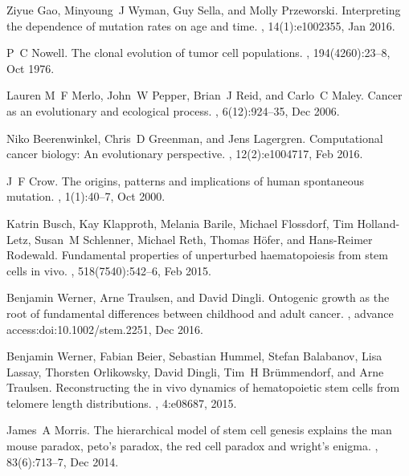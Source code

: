 \documentclass[aps,singlecolumn]{revtex4-1}
\begin{document}
%


%
\begin{thebibliography}{10}

Ziyue Gao, Minyoung~J Wyman, Guy Sella, and Molly Przeworski.
\newblock Interpreting the dependence of mutation rates on age and time.
, 14(1):e1002355, Jan 2016.

P~C Nowell.
\newblock The clonal evolution of tumor cell populations.
, 194(4260):23--8, Oct 1976.

Lauren M~F Merlo, John~W Pepper, Brian~J Reid, and Carlo~C Maley.
\newblock Cancer as an evolutionary and ecological process.
, 6(12):924--35, Dec 2006.

Niko Beerenwinkel, Chris~D Greenman, and Jens Lagergren.
\newblock Computational cancer biology: An evolutionary perspective.
, 12(2):e1004717, Feb 2016.

J~F Crow.
\newblock The origins, patterns and implications of human spontaneous mutation.
, 1(1):40--7, Oct 2000.

Katrin Busch, Kay Klapproth, Melania Barile, Michael Flossdorf, Tim
  Holland-Letz, Susan~M Schlenner, Michael Reth, Thomas H{\"o}fer, and
  Hans-Reimer Rodewald.
\newblock Fundamental properties of unperturbed haematopoiesis from stem cells
  in vivo.
, 518(7540):542--6, Feb 2015.

Benjamin Werner, Arne Traulsen, and David Dingli.
\newblock Ontogenic growth as the root of fundamental differences between
  childhood and adult cancer.
, advance access:doi:10.1002/stem.2251, Dec 2016.

Benjamin Werner, Fabian Beier, Sebastian Hummel, Stefan Balabanov, Lisa Lassay,
  Thorsten Orlikowsky, David Dingli, Tim~H Br{\"u}mmendorf, and Arne Traulsen.
\newblock Reconstructing the in vivo dynamics of hematopoietic stem cells from
  telomere length distributions.
, 4:e08687, 2015.

James~A Morris.
\newblock The hierarchical model of stem cell genesis explains the man mouse
  paradox, peto's paradox, the red cell paradox and wright's enigma.
, 83(6):713--7, Dec 2014.


\end{thebibliography}
\end{document}

